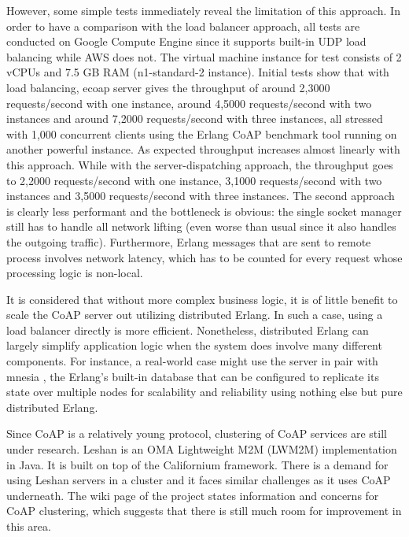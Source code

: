 However, some simple tests immediately reveal the limitation of this approach. In order to have a comparison with the load balancer approach, all tests are conducted on Google Compute Engine \autocite{google_compute_engine} since it supports built-in UDP load balancing while AWS does not. The virtual machine instance for test consists of 2 vCPUs and 7.5 GB RAM (n1-standard-2 instance). Initial tests show that with load balancing, ecoap server gives the throughput of around 2,3000 requests/second with one instance, around 4,5000 requests/second with two instances and around 7,2000 requests/second with three instances, all stressed with 1,000 concurrent clients using the Erlang CoAP benchmark tool running on another powerful instance. As expected throughput increases almost linearly with this approach. While with the server-dispatching approach, the throughput goes to 2,2000 requests/second with one instance, 3,1000 requests/second with two instances and 3,5000 requests/second with three instances. The second approach is clearly less performant and the bottleneck is obvious: the single socket manager still has to handle all network lifting (even worse than usual since it also handles the outgoing traffic). Furthermore, Erlang messages that are sent to remote process involves network latency, which has to be counted for every request whose processing logic is non-local.

It is considered that without more complex business logic, it is of little benefit to scale the CoAP server out utilizing distributed Erlang. In such a case, using a load balancer directly is more efficient. Nonetheless, distributed Erlang can largely simplify application logic when the system does involve many different components. For instance, a real-world case might use the server in pair with mnesia \autocite{mnesia}, the Erlang's built-in database that can be configured to replicate its state over multiple nodes for scalability and reliability using nothing else but pure distributed Erlang. 

Since CoAP is a relatively young protocol, clustering of CoAP services are still under research. Leshan \autocite{leshan} is an OMA Lightweight M2M (LWM2M) implementation in Java. It is built on top of the Californium framework. There is a demand for using Leshan servers in a cluster and it faces similar challenges as it uses CoAP underneath. The wiki page of the project \autocite{leshan_cluster} states information and concerns for CoAP clustering, which suggests that there is still much room for improvement in this area.


